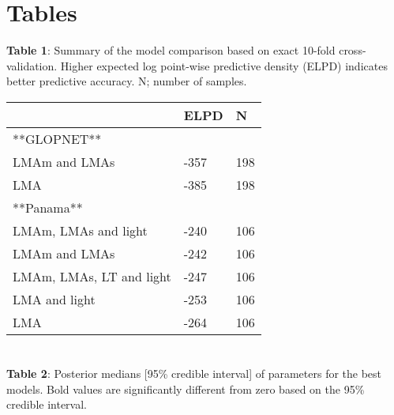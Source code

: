 \documentclass[12pt,]{article}
\theoremstyle{definition}
\theoremstyle{definition}
\theoremstyle{definition}
\theoremstyle{remark}
\begin{document}
\newpage

\hypertarget{tables}{%
\section{Tables}\label{tables}}

\textbf{Table 1}: Summary of the model comparison based on exact 10-fold
cross-validation. Higher expected log point-wise predictive density
(ELPD) indicates better predictive accuracy. N; number of samples.

\begin{tabular}{l|l|l}
\hline
 & ELPD & N\\
\hline
**GLOPNET** &  & \\
\hline
LMAm and LMAs & -357 & 198\\
\hline
LMA & -385 & 198\\
\hline
**Panama** &  & \\
\hline
LMAm, LMAs and light & -240 & 106\\
\hline
LMAm and LMAs & -242 & 106\\
\hline
LMAm, LMAs, LT and light & -247 & 106\\
\hline
LMA and light & -253 & 106\\
\hline
LMA & -264 & 106\\
\hline
\end{tabular}

\newpage

\hypertarget{section}{%
\section{}\label{section}}

\textbf{Table 2}: Posterior medians {[}95\% credible interval{]} of
parameters for the best models. Bold values are significantly different
from zero based on the 95\% credible interval.
\end{document}
